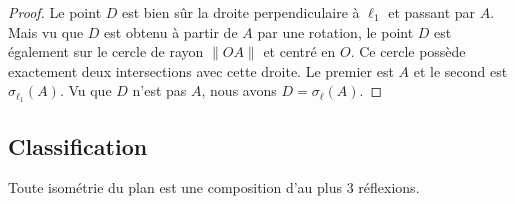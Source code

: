 \begin{proof}
    Le point \( D\) est bien sûr la droite perpendiculaire à \( \ell_1\) et passant par \( A\). Mais vu que \( D\) est obtenu à partir de \( A\) par une rotation, le point \( D\) est également sur le cercle de rayon \( \| OA \|\) et centré en \( O\). Ce cercle possède exactement deux intersections avec cette droite. Le premier est \( A\) et le second est \( \sigma_{\ell_1}(A)\). Vu que \( D\) n'est pas \( A\), nous avons \( D=\sigma_{\ell}(A)\).
\end{proof}

\subsection{Classification}

\begin{theorem}      \label{THOooRORQooTDWFdv}
    Toute isométrie du plan est une composition d'au plus \( 3\) réflexions. 
\end{theorem}

